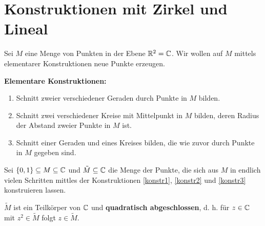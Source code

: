 \section{Konstruktionen mit Zirkel und Lineal}
Sei $M$ eine Menge von Punkten in der Ebene $\mathbb{R}^2 = \mathbb{C}$. Wir wollen auf $M$ mittels elementarer Konstruktionen neue Punkte erzeugen. 

\textbf{Elementare Konstruktionen:}
\begin{enumerate}[label=(\Roman*)]
	\item\label{konstr1} Schnitt zweier verschiedener Geraden durch Punkte in $M$ bilden.
	\item\label{konstr2} Schnitt zwei verschiedener Kreise mit Mittelpunkt in $M$ bilden, deren Radius der Abstand zweier Punkte in $M$ ist.
	\item\label{konstr3} Schnitt einer Geraden und eines Kreises bilden, die wie zuvor durch Punkte in $M$ gegeben sind. 
\end{enumerate}
Sei $\{0,1\} \subseteq M \subseteq \mathbb{C}$ und $\tilde{M} \subseteq \mathbb{C}$ die Menge der Punkte, die sich aus $M$ in endlich vielen Schritten mittles der Konstruktionen \ref{konstr1}, \ref{konstr2} und \ref{konstr3} konstruieren lassen.
\begin{satz}\label{satz9_1}
	$\tilde{M}$ ist ein Teilkörper von $\mathbb{C}$ und \textbf{quadratisch abgeschlossen}, d. h. für $z \in \mathbb{C}$ mit $z^2 \in \tilde{M}$ folgt $z \in \tilde{M}$.
\end{satz}

